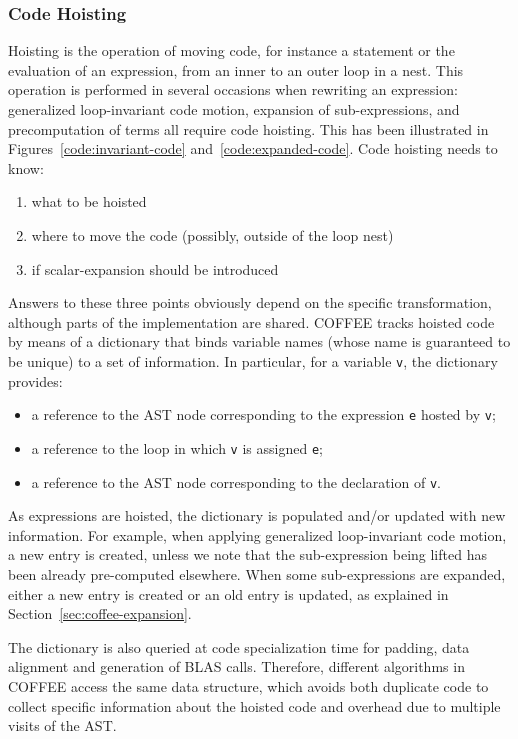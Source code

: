 \subsubsection{Code Hoisting}
Hoisting is the operation of moving code, for instance a statement or the evaluation of an expression, from an inner to an outer loop in a nest. This operation is performed in several occasions when rewriting an expression: generalized loop-invariant code motion, expansion of sub-expressions, and precomputation of terms all require code hoisting. This has been illustrated in Figures~\ref{code:invariant-code} and~\ref{code:expanded-code}. Code hoisting needs to know:
\begin{enumerate}
\item what to be hoisted
\item where to move the code (possibly, outside of the loop nest)
\item if scalar-expansion should be introduced
\end{enumerate}
Answers to these three points obviously depend on the specific transformation, although parts of the implementation are shared. COFFEE tracks hoisted code by means of a dictionary that binds variable names (whose name is guaranteed to be unique) to a set of information. In particular, for a variable \texttt{v}, the dictionary provides:
\begin{itemize}
\item a reference to the AST node corresponding to the expression \texttt{e} hosted by \texttt{v};
\item a reference to the loop in which \texttt{v} is assigned \texttt{e};
\item a reference to the AST node corresponding to the declaration of \texttt{v}.
\end{itemize}
As expressions are hoisted, the dictionary is populated and/or updated with new information. For example, when applying generalized loop-invariant code motion, a new entry is created, unless we note that the sub-expression being lifted has been already pre-computed elsewhere. When some sub-expressions are expanded, either a new entry is created or an old entry is updated, as explained in Section~\ref{sec:coffee-expansion}. 

The dictionary is also queried at code specialization time for padding, data alignment and generation of BLAS calls. Therefore, different algorithms in COFFEE access the same data structure, which avoids both duplicate code to collect specific information about the hoisted code and overhead due to multiple visits of the AST.

